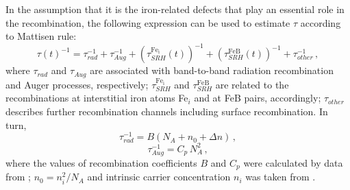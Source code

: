 \documentclass[sn-mathphys]{sn-jnl}%
\theoremstyle{thmstyleone}%
\theoremstyle{thmstyletwo}%
\theoremstyle{thmstylethree}%
\begin{document}
In the assumption that it is the iron-related defects that play an essential role in the recombination,
the following expression can be used to estimate $\tau$ according to Mattisen rule:
\begin{equation}
\label{eqTau}
\tau(t)^{-1}=\tau_{rad}^{-1}+\tau_{Aug}^{-1}+(\tau_{SRH}^{\mathrm{Fe_i}}(t))^{-1}
+(\tau_{SRH}^\mathrm{FeB}(t))^{-1}+\tau_{other}^{-1}\,,
\end{equation}
where
$\tau_{rad}$ and $\tau_{Aug}$ are associated with
band-to-band radiation recombination and Auger processes, respectively;
$\tau_{SRH}^{\mathrm{Fe_i}}$  and $\tau_{SRH}^\mathrm{FeB}$ are related to the
recombinations at interstitial iron atoms Fe$_i$ and at FeB pairs, accordingly;
$\tau_{other}$ describes further
recombination channels including surface recombination.
In turn,
\begin{equation}
\label{eqTauRad}
\tau_{rad}^{-1}=B(N_A+n_0+\Delta n)\,,
\end{equation}
\begin{equation}
\label{eqTauAug}
\tau_{Aug}^{-1}=C_p\,N_A^2\,,
\end{equation}
where the values of recombination coefficients $B$ and $C_p$ were calculated by data from \cite{Si_BtB,Si_Auger};
$n_0=n_i^2/N_A$ and intrinsic carrier concentration $n_i$ was taken from \cite{Si_ni_Couderc}.
\end{document}
